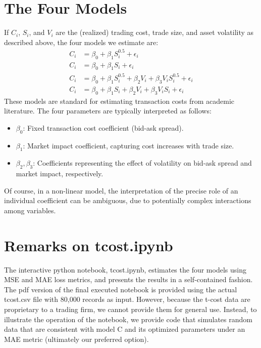 \documentclass[12pt]{article}
\begin{document}
\newpage
\section{The Four Models}
If $C_i$, $S_i$, and $V_i$ are the (realized) trading cost, trade size, and asset volatility as described above, the four models we estimate are:
\begin{align}
    {C}_i &= \beta_0 + \beta_1  {S}_i^{0.5} + \epsilon_i \tag{a} \label{eq:a}\\
    {C}_i &= \beta_0 + \beta_1  {S}_i + \epsilon_i \tag{b} \label{eq:b} \\
    {C}_i &= \beta_0 + \beta_1  {S}_i^{0.5} + \beta_2  {V}_i + \beta_3  {V}_i  {S}_i^{0.5} + \epsilon_i \tag{c} \label{eq:c}\\
    {C}_i &= \beta_0 + \beta_1 {S}_i + \beta_2 {V}_i + \beta_3  {V}_i  {S}_i + \epsilon_i \tag{d} \label{eq:d}
\end{align}
These models are standard for estimating transaction costs from academic literature. The four parameters are typically interpreted as follows:
\begin{itemize}
    \item $\beta_0$: Fixed transaction cost coefficient (bid-ask spread).
    \item $\beta_1$: Market impact coefficient, capturing cost increases with trade size.
    \item $\beta_2, \beta_3$: Coefficients representing the effect of volatility on bid-ask spread and market impact, respectively.
\end{itemize}
Of course, in a non-linear model, the interpretation of the precise role of an individual coefficient can be ambiguous, due to potentially complex interactions among variables. 

\section{Remarks on tcost.ipynb}

The interactive python notebook, tcost.ipynb, estimates the four models using MSE and MAE loss metrics, and presents the results in a self-contained fashion.  The pdf version of the final executed notebook is provided using the actual tcost.csv file with 80,000 records as input.   However, because the t-cost data are proprietary to a trading firm, we cannot provide them for general use.  Instead, to illustrate the operation of the notebook, we provide code that simulates random data that are consistent with model C and its optimized parameters under an MAE metric (ultimately our preferred option).
\end{document}
